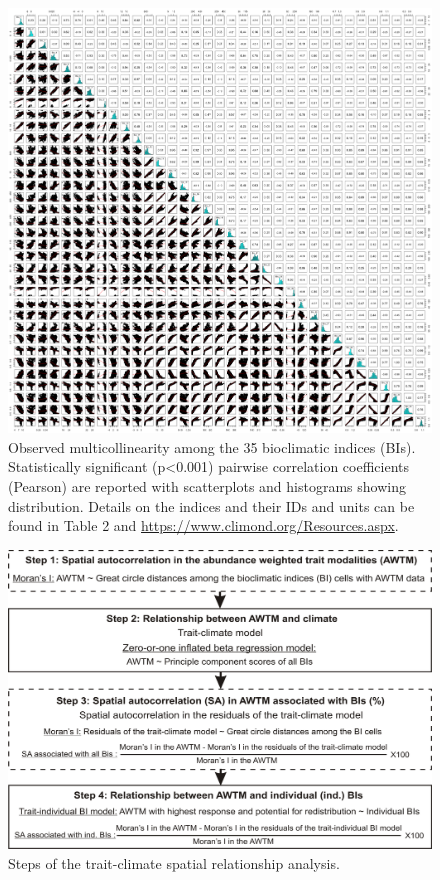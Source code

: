 \begin{landscape}

\begin{figure}[h!]
  \centering
  \vspace{-2.3cm} \includegraphics[width=1.2\textwidth]{Figures/Fig_C_5.png}
  \caption{Observed multicollinearity among the 35 bioclimatic indices (BIs). Statistically significant (p<0.001) pairwise correlation coefficients (Pearson) are reported with scatterplots and histograms showing distribution. Details on the indices and their IDs and units can be found in Table 2 and \href{https://www.climond.org/Resources.aspx}{https://www.climond.org/Resources.aspx}.}
  \label{Fig_C_5}
\end{figure}

\end{landscape}

\clearpage

\begin{figure}[h!]
  \centering
  \includegraphics[width=1.1\textwidth]{Figures/Fig_C_6.png}
  \caption{Steps of the trait-climate spatial relationship analysis.}
  \label{Fig_C_6}
\end{figure}

